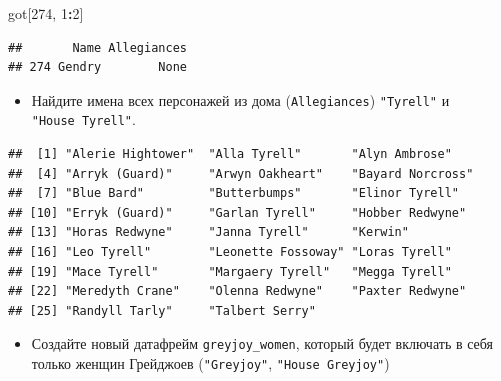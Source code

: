 \documentclass[]{book}
\newenvironment{Shaded}{\begin{snugshade}}{\end{snugshade}}
\newcommand{\KeywordTok}[1]{\textcolor[rgb]{0.13,0.29,0.53}{\textbf{#1}}}
\newcommand{\DecValTok}[1]{\textcolor[rgb]{0.00,0.00,0.81}{#1}}
\newcommand{\StringTok}[1]{\textcolor[rgb]{0.31,0.60,0.02}{#1}}
\newcommand{\OperatorTok}[1]{\textcolor[rgb]{0.81,0.36,0.00}{\textbf{#1}}}
\newcommand{\NormalTok}[1]{#1}
\providecommand{\tightlist}{%
  \setlength{\itemsep}{0pt}\setlength{\parskip}{0pt}}
\begin{document}
\begin{Shaded}
\begin{Highlighting}[]
\NormalTok{got[}\DecValTok{274}\NormalTok{, }\DecValTok{1}\OperatorTok{:}\DecValTok{2}\NormalTok{]}
\end{Highlighting}
\end{Shaded}

\begin{verbatim}
##       Name Allegiances
## 274 Gendry        None
\end{verbatim}

\begin{itemize}
\tightlist
\item
  Найдите имена всех персонажей из дома (\texttt{Allegiances})
  \texttt{"Tyrell"} и \texttt{"House\ Tyrell"}.
\end{itemize}

\begin{Shaded}
\end{Shaded}

\begin{verbatim}
##  [1] "Alerie Hightower"  "Alla Tyrell"       "Alyn Ambrose"     
##  [4] "Arryk (Guard)"     "Arwyn Oakheart"    "Bayard Norcross"  
##  [7] "Blue Bard"         "Butterbumps"       "Elinor Tyrell"    
## [10] "Erryk (Guard)"     "Garlan Tyrell"     "Hobber Redwyne"   
## [13] "Horas Redwyne"     "Janna Tyrell"      "Kerwin"           
## [16] "Leo Tyrell"        "Leonette Fossoway" "Loras Tyrell"     
## [19] "Mace Tyrell"       "Margaery Tyrell"   "Megga Tyrell"     
## [22] "Meredyth Crane"    "Olenna Redwyne"    "Paxter Redwyne"   
## [25] "Randyll Tarly"     "Talbert Serry"
\end{verbatim}

\begin{itemize}
\tightlist
\item
  Создайте новый датафрейм \texttt{greyjoy\_women}, который будет
  включать в себя только женщин Грейджоев (\texttt{"Greyjoy"},
  \texttt{"House\ Greyjoy"})
\end{itemize}

\begin{Shaded}
\end{Shaded}
\end{document}
